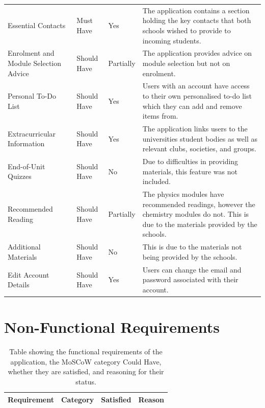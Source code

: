 \documentclass{l4proj}
\begin{document}
\begin{appendices}
\begin{table}[]
\begin{tabular}{ m{3cm}  m{2cm}  m{1.5cm}  m{17em} }
    Essential Contacts & Must Have & Yes & The application contains a section holding the key contacts that both schools wished to provide to incoming students. \\

    Enrolment and Module Selection Advice & Should Have & Partially & The application provides advice on module selection but not on enrolment. \\
    
    Personal To-Do List & Should Have & Yes & Users with an account have access to their own personalised to-do list which they can add and remove items from. \\
    
    Extracurricular Information & Should Have & Yes & The application links users to the universities student bodies as well as relevant clubs,  societies,  and groups. \\
    
    End-of-Unit Quizzes & Should Have & No & Due to difficulties in providing materials,  this feature was not included. \\
    
    Recommended Reading & Should Have & Partially & The physics modules have recommended readings,  however the chemistry modules do not. This is due to the materials provided by the schools. \\
    
    Additional Materials & Should Have & No & This is due to the materials not being provided by the schools. \\
    
    Edit Account Details & Should Have & Yes & Users can change the email and password associated with their account. \\

    \end{tabular}
\end{table}

\section{Non-Functional Requirements} \label{app:nonFuncMet}

\begin{table}[]
    \caption{Table showing the functional requirements of the application,  the MoSCoW category Could Have,  whether they are satisfied,  and reasoning for their status. }\label{tab:functionalAppCont}
    \begin{tabular}{ m{3cm}  m{2cm}  m{1.5cm}  m{17em} }
    \hline
    \textbf{Requirement}    & \textbf{Category}                & \textbf{Satisfied}      & \textbf{Reason}                      \\ %
    \hline
         

\end{tabular}
\end{table}
\end{appendices}
\end{document}
